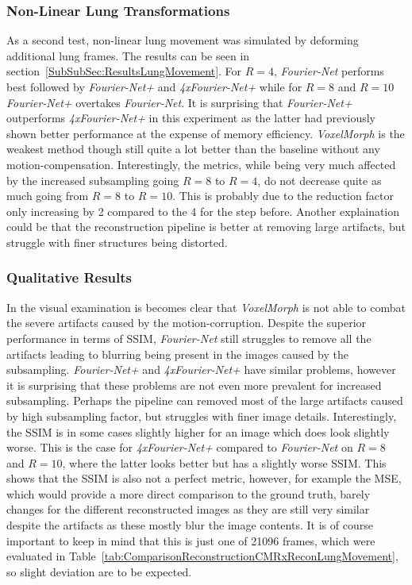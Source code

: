 \subsubsection{Non-Linear Lung Transformations}
As a second test, non-linear lung movement was simulated by deforming additional lung frames. The results can be seen in section~\ref{SubSubSec:ResultsLungMovement}. For $R=4$, \emph{Fourier-Net} performs best followed by \emph{Fourier-Net+} and \emph{4xFourier-Net+} while for $R=8$ and $R=10$ \emph{Fourier-Net+} overtakes \emph{Fourier-Net}. It is surprising that \emph{Fourier-Net+} outperforms \emph{4xFourier-Net+} in this experiment as the latter had previously shown better performance at the expense of memory efficiency. \emph{VoxelMorph} is the weakest method though still quite a lot better than the baseline without any motion-compensation. Interestingly, the metrics, while being very much affected by the increased subsampling going $R=8$ to $R=4$, do not decrease quite as much going from $R=8$ to $R=10$. This is probably due to the reduction factor only increasing by 2 compared to the 4 for the step before. Another explaination could be that the reconstruction pipeline is better at removing large artifacts, but struggle with finer structures being distorted.

\subsubsection{Qualitative Results}
In the visual examination is becomes clear that \emph{VoxelMorph} is not able to combat the severe artifacts caused by the motion-corruption. Despite the superior performance in terms of SSIM, \emph{Fourier-Net} still struggles to remove all the artifacts leading to blurring being present in the images caused by the subsampling. \emph{Fourier-Net+} and \emph{4xFourier-Net+} have similar problems, however it is surprising that these problems are not even more prevalent for increased subsampling. Perhaps the pipeline can removed most of the large artifacts caused by high subsampling factor, but struggles with finer image details. Interestingly, the SSIM is in some cases slightly higher for an image which does look slightly worse. This is the case for \emph{4xFourier-Net+} compared to \emph{Fourier-Net} on $R=8$ and $R=10$, where the latter looks better but has a slightly worse SSIM. This shows that the SSIM is also not a perfect metric, however, for example the MSE, which would provide a more direct comparison to the ground truth, barely changes for the different reconstructed images as they are still very similar despite the artifacts as these mostly blur the image contents. It is of course important to keep in mind that this is just one of 21096 frames, which were evaluated in Table~\ref{tab:ComparisonReconstructionCMRxReconLungMovement}, so slight deviation are to be expected.

